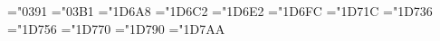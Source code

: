 \protected{}
\protected{}
\protected{}
\protected{}
\protected{}
\protected{}
\protected{}
\protected{}
\protected{}
\protected{}
\protected{}
\protected{}
\protected{}
\protected{}

\chardef\greekrmA="0391   \chardef\greekrma="03B1
\chardef\greekbfA="1D6A8  \chardef\greekbfa="1D6C2
\chardef\greekitA="1D6E2  \chardef\greekita="1D6FC
\chardef\greekbiA="1D71C  \chardef\greekbia="1D736
\chardef\greeksnA="1D756  \chardef\greeksna="1D770
\chardef\greeksiA="1D790  \chardef\greeksia="1D7AA

\protected\def\nitgreek   {\umathrangeGREEK\greekrmA \umathrangegreek\greekita}
\protected\def\rmgreek    {\umathrangeGREEK\greekrmA \umathrangegreek\greekrma}
\protected\def\bfgreek    {\umathrangeGREEK\greekbfA \umathrangegreek\greekbfa}
\protected\def\bigreek    {\umathrangeGREEK\greekbfA \umathrangegreek\greekbia}
\protected\def\sansgreek  {\umathrangeGREEK\greeksnA \umathrangegreek\greeksna}
\protected\def\isansgreek {\umathrangeGREEK\greeksnA \umathrangegreek\greeksia}


